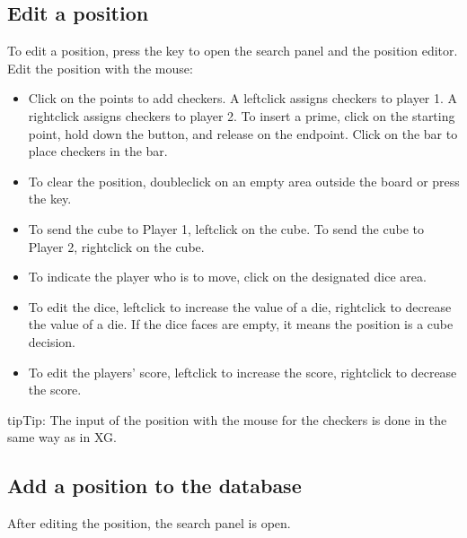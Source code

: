 \documentclass[letterpaper,10pt,english]{sphinxmanual}
\begin{document}
\subsection{Edit a position}
\label{\detokenize{guide_utilisateur:editer-une-position}}\label{\detokenize{guide_utilisateur:guide-edit-position}}
\sphinxAtStartPar
To edit a position, press the  key to open the search panel and the position editor. Edit the position with the mouse:
\begin{itemize}
\item {} 
\sphinxAtStartPar
Click on the points to add checkers. A left\sphinxhyphen{}click assigns checkers to player 1. A right\sphinxhyphen{}click assigns checkers to player 2. To insert a prime, click on the starting point, hold down the button, and release on the endpoint. Click on the bar to place checkers in the bar.

\item {} 
\sphinxAtStartPar
To clear the position, double\sphinxhyphen{}click on an empty area outside the board or press the  key.

\item {} 
\sphinxAtStartPar
To send the cube to Player 1, left\sphinxhyphen{}click on the cube. To send the cube to Player 2, right\sphinxhyphen{}click on the cube.

\item {} 
\sphinxAtStartPar
To indicate the player who is to move, click on the designated dice area.

\item {} 
\sphinxAtStartPar
To edit the dice, left\sphinxhyphen{}click to increase the value of a die, right\sphinxhyphen{}click to decrease the value of a die. If the dice faces are empty, it means the position is a cube decision.

\item {} 
\sphinxAtStartPar
To edit the players’ score, left\sphinxhyphen{}click to increase the score, right\sphinxhyphen{}click to decrease the score.

\end{itemize}

\begin{sphinxadmonition}{tip}{Tip:}
\sphinxAtStartPar
The input of the position with the mouse for the checkers is done in the same way as in XG.
\end{sphinxadmonition}


\subsection{Add a position to the database}
\label{\detokenize{guide_utilisateur:ajouter-une-position-a-la-base-de-donnees}}
\sphinxAtStartPar
After editing the position, the search panel is open.
\end{document}
